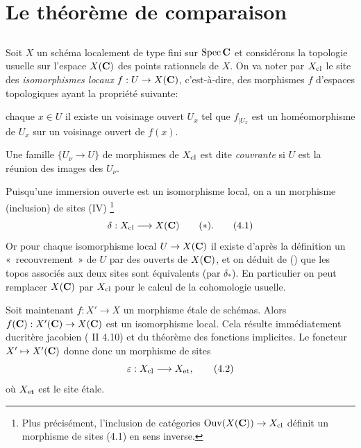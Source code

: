 \documentclass[10pt]{../fichiers-configuration-latex/smfart}
\begin{document}
\section{Le théorème de comparaison}

\setcounter{subsection}{-1}
\subsection{}
Soit $X$ un schéma localement de type fini sur $\operatorname{Spec} \mathbf{C}$ et
considérons la topologie usuelle sur l'espace $X(\mathbf{C})$ des
points rationnels de $X$. On va noter par $X_{\operatorname{cl}}$ le site des
\emph{isomorphismes locaux} $f:U\rightarrow X(\mathbf{C})$,
c'est-à-dire, des morphismes $f$ d'espaces topologiques ayant la
propriété suivante:

 chaque $x\in U$ il existe un voisinage ouvert $U_x$ tel que
$f_{\mid U_x}$ est un homéomorphisme de $U_x$ sur un voisinage ouvert de
$f(x)$. 

Une famille $\{U_{\nu}\rightarrow U\}$ de morphismes de $X_{\operatorname{cl}}$ est
dite \emph{couvrante} si $U$ est la réunion des images des $U_{\nu}$.

Puisqu'une immersion ouverte est un isomorphisme local, on a un
morphisme (inclusion) de sites (IV\quad ) %
\footnote{Plus précisément, l'inclusion de catégories
  $\operatorname{Ouv}(X(\mathbf{C}))\rightarrow X_{\operatorname{cl}}$ définit un morphisme de
  sites (4.1) en sens inverse.}
\begin{equation*}
\delta:X_{\operatorname{cl}}\longrightarrow X(\mathbf{C})\qquad
(\ast){}.\tag{4.1}
\end{equation*}
Or pour chaque isomorphisme local $U\rightarrow X(\mathbf{C})$ il
existe d'après la définition un « recouvrement » de $U$ par des
ouverts de $X(\mathbf{C})$, et on déduit de (\quad) que les topos %
associés aux deux sites sont équivalents (par $\delta_{\ast}$). En
particulier on peut remplacer $X(\mathbf{C})$ par $X_{\operatorname{cl}}$ pour le
calcul de la cohomologie usuelle.

Soit maintenant $f:X'\rightarrow X$ un morphisme étale de
schémas. Alors $f(\mathbf{C}):X'(\mathbf{C})\rightarrow X(\mathbf{C})$
est un isomorphisme local. Cela résulte immédiatement du\pageoriginale critère
jacobien ( II 4.10) et du théorème des fonctions implicites. Le
foncteur $X'\mapsto X'(\mathbf{C})$ donne donc un morphisme de sites
\begin{equation*}
\varepsilon:X_{\operatorname{cl}}\longrightarrow X_{\mathrm{et}}{},\tag{4.2}
\end{equation*}
où $X_{\mathrm{et}}$ est le site étale.
\end{document}
